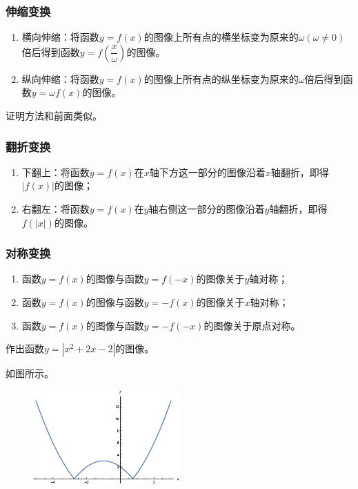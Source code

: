 \documentclass[lang=cn,math=cm,chinesefont=nofont,11pt,scheme=chinese,twocol]{elegantbook}
\begin{document}
\subsubsection{伸缩变换}

\begin{enumerate}
  \item 横向伸缩：将函数$y=f(x)$的图像上所有点的横坐标变为原来的$\omega(\omega\neq 0)$倍后得到函数$y=f(\dfrac{x}{\omega})$的图像。
  \item 纵向伸缩：将函数$y=f(x)$的图像上所有点的纵坐标变为原来的$\omega$倍后得到函数$y=\omega f(x)$的图像。
\end{enumerate}

证明方法和前面类似。

\subsubsection{翻折变换}

\begin{enumerate}
  \item 下翻上：将函数$y=f(x)$在$x$轴下方这一部分的图像沿着$x$轴翻折，即得$\left| f(x)\right|$的图像；
  \item 右翻左：将函数$y=f(x)$在$y$轴右侧这一部分的图像沿着$y$轴翻折，即得$f(\left| x\right|)$的图像。
\end{enumerate}

\subsubsection{对称变换}

\begin{enumerate}
  \item 函数$y=f(x)$的图像与函数$y=f(-x)$的图像关于$y$轴对称；
  \item 函数$y=f(x)$的图像与函数$y=-f(x)$的图像关于$x$轴对称；
  \item 函数$y=f(x)$的图像与函数$y=-f(-x)$的图像关于原点对称。
\end{enumerate}

\begin{example}
  作出函数$y=\left| x^2+2x-2\right|$的图像。
\end{example}

\begin{solution}
  如图所示。
\end{solution}

\begin{figure}[h]
  \centering
  \includegraphics[width=0.5\textwidth]{image/2.1.5function3.eps}
  \label{img:2.1.5function3}
\end{figure}
\end{document}
